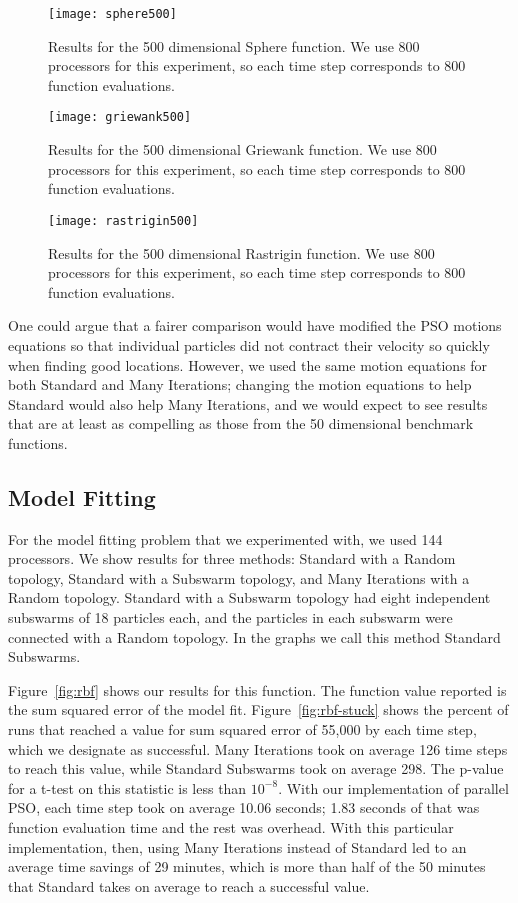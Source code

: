 \documentclass[smallcondensed]{svjour3}
\newcommand{\fig}[1]{Figure~\ref{fig:#1}}
\begin{document}
\begin{figure}
  \centering
  \texttt{[image: sphere500]}
  \caption{Results for the 500 dimensional Sphere function.  We use 800
  processors for this experiment, so each time step corresponds to 800 function
  evaluations.}
  \label{fig:sphere500}
\end{figure}

\begin{figure}
  \centering
  \texttt{[image: griewank500]}
  \caption{Results for the 500 dimensional Griewank function.  We use 800
  processors for this experiment, so each time step corresponds to 800 function
  evaluations.}
  \label{fig:griewank500}
\end{figure}

\begin{figure}
  \centering
  \texttt{[image: rastrigin500]}
  \caption{Results for the 500 dimensional Rastrigin function.  We use 800
  processors for this experiment, so each time step corresponds to 800 function
  evaluations.}
  \label{fig:rastrigin500}
\end{figure}

One could argue that a fairer comparison would have modified the PSO motions
equations so that individual particles did not contract their velocity so
quickly when finding good locations.  However, we used the same motion
equations for both Standard and Many Iterations; changing the motion equations
to help Standard would also help Many Iterations, and we would expect to see
results that are at least as compelling as those from the 50 dimensional
benchmark functions.

\subsection{Model Fitting}
\label{sec:model}

For the model fitting problem that we experimented with, we used 144
processors.  We show results for three methods: Standard with a Random
topology, Standard with a Subswarm topology, and Many Iterations with a Random
topology.  Standard with a Subswarm topology had eight independent subswarms of
18 particles each, and the particles in each subswarm were connected with a
Random topology.  In the graphs we call this method Standard Subswarms.

\fig{rbf} shows our results for this function.  The function value reported is
the sum squared error of the model fit.  \fig{rbf-stuck} shows the percent of
runs that reached a value for sum squared error of 55,000 by each time step,
which we designate as successful.  Many Iterations took on average 126 time
steps to reach this value, while Standard Subswarms took on average 298.  The
p-value for a t-test on this statistic is less than $10^{-8}$.  With our
implementation of parallel PSO, each time step took on average 10.06 seconds;
1.83 seconds of that was function evaluation time and the rest was overhead.
With this particular implementation, then, using Many Iterations instead of
Standard led to an average time savings of 29 minutes, which is more than half
of the 50 minutes that Standard takes on average to reach a successful value.
\end{document}

